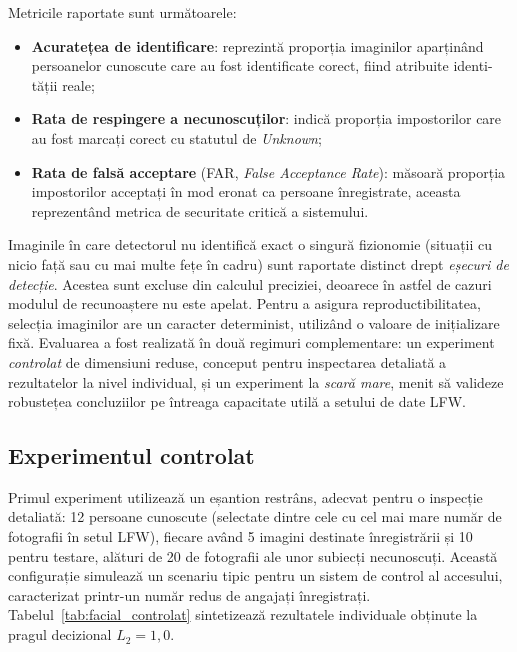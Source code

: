 \documentclass[../../main.tex]{subfiles}
\begin{document}
Metricile raportate sunt următoarele:

\begin{itemize} \item \textbf{Acuratețea de identificare}: reprezintă proporția imaginilor aparținând persoanelor cunoscute care au fost identificate corect, fiind atribuite identi-tății reale; \item \textbf{Rata de respingere a necunoscuților}: indică proporția impostorilor care au fost marcați corect cu statutul de \textit{Unknown}; \item \textbf{Rata de falsă acceptare} (FAR, \textit{False Acceptance Rate}): măsoară proporția impostorilor acceptați în mod eronat ca persoane înregistrate, aceasta reprezentând metrica de securitate critică a sistemului. \end{itemize}

Imaginile în care detectorul nu identifică exact o singură fizionomie (situații cu nicio față sau cu mai multe fețe în cadru) sunt raportate distinct drept \textit{eșecuri de detecție}. Acestea sunt excluse din calculul preciziei, deoarece în astfel de cazuri modulul de recunoaștere nu este apelat. Pentru a asigura reproductibilitatea, selecția imaginilor are un caracter determinist, utilizând o valoare de inițializare fixă. Evaluarea a fost realizată în două regimuri complementare: un experiment \textit{controlat} de dimensiuni reduse, conceput pentru inspectarea detaliată a rezultatelor la nivel individual, și un experiment la \textit{scară mare}, menit să valideze robustețea concluziilor pe întreaga capacitate utilă a setului de date LFW.

\subsection{Experimentul controlat}
\label{subsec:facial_controlat}

Primul experiment utilizează un eșantion restrâns, adecvat pentru o inspecție detaliată: 12 persoane cunoscute (selectate dintre cele cu cel mai mare număr de fotografii în setul LFW), fiecare având 5 imagini destinate înregistrării și 10 pentru testare, alături de 20 de fotografii ale unor subiecți necunoscuți. Această configurație simulează un scenariu tipic pentru un sistem de control al accesului, caracterizat printr-un număr redus de angajați înregistrați. Tabelul~\ref{tab:facial_controlat} sintetizează rezultatele individuale obținute la pragul decizional $L_2 = 1{,}0$.
\end{document}
